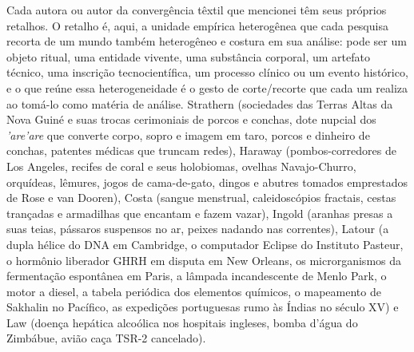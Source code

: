 Cada autora ou autor da convergência têxtil que mencionei têm seus próprios retalhos. O retalho é, aqui, a unidade empírica heterogênea que cada pesquisa recorta de um mundo também heterogêneo e costura em sua análise: pode ser um objeto ritual, uma entidade vivente, uma substância corporal, um artefato técnico, uma inscrição tecnocientífica, um processo clínico ou um evento histórico, e o que reúne essa heterogeneidade é o gesto de corte/recorte que cada um realiza ao tomá-lo como matéria de análise. Strathern (sociedades das Terras Altas da Nova Guiné e suas trocas cerimoniais de porcos e conchas, dote nupcial dos \textit{'are'are} que converte corpo, sopro e imagem em taro, porcos e dinheiro de conchas, patentes médicas que truncam redes), Haraway (pombos-corredores de Los Angeles, recifes de coral e seus holobiomas, ovelhas Navajo-Churro, orquídeas, lêmures, jogos de cama-de-gato, dingos e abutres tomados emprestados de Rose e van Dooren), Costa (sangue menstrual, caleidoscópios fractais, cestas trançadas e armadilhas que encantam e fazem vazar), Ingold (aranhas presas a suas teias, pássaros suspensos no ar, peixes nadando nas correntes), Latour (a dupla hélice do DNA em Cambridge, o computador Eclipse do Instituto Pasteur, o hormônio liberador GHRH em disputa em New Orleans, os microrganismos da fermentação espontânea em Paris, a lâmpada incandescente de Menlo Park, o motor a diesel, a tabela periódica dos elementos químicos, o mapeamento de Sakhalin no Pacífico, as expedições portuguesas rumo às Índias no século XV) e Law (doença hepática alcoólica nos hospitais ingleses, bomba d'água do Zimbábue, avião caça TSR-2 cancelado).

